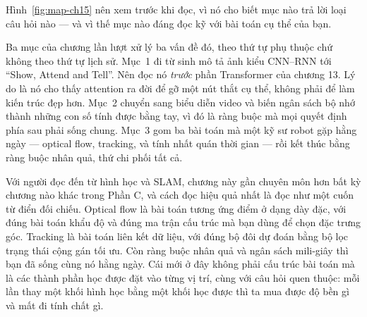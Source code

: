 \documentclass[../../deep_learning.tex]{subfiles}
\begin{document}
Hình~\ref{fig:map-ch15} nên xem trước khi đọc, vì nó cho biết mục nào trả lời loại câu hỏi nào --- và vì thế mục nào đáng đọc kỹ với bài toán cụ thể của bạn.

Ba mục của chương lần lượt xử lý ba vấn đề đó, theo thứ tự phụ thuộc chứ không theo thứ tự lịch sử. Mục~1 đi từ sinh mô tả ảnh kiểu CNN--RNN tới ``Show, Attend and Tell''. Nên đọc nó \emph{trước} phần Transformer của chương 13. Lý do là nó cho thấy attention ra đời để gỡ một nút thắt cụ thể, không phải để làm kiến trúc đẹp hơn. Mục~2 chuyển sang biểu diễn video và biến ngân sách bộ nhớ thành những con số tính được bằng tay, vì đó là ràng buộc mà mọi quyết định phía sau phải sống chung. Mục~3 gom ba bài toán mà một kỹ sư robot gặp hằng ngày --- optical flow, tracking, và tính nhất quán thời gian --- rồi kết thúc bằng ràng buộc nhân quả, thứ chi phối tất cả.

Với người đọc đến từ hình học và SLAM, chương này gần chuyên môn hơn bất kỳ chương nào khác trong Phần C, và cách đọc hiệu quả nhất là đọc như một cuốn từ điển đối chiếu. Optical flow là bài toán tương ứng điểm ở dạng dày đặc, với đúng bài toán khẩu độ và đúng ma trận cấu trúc mà bạn dùng để chọn đặc trưng góc. Tracking là bài toán liên kết dữ liệu, với đúng bộ đôi dự đoán bằng bộ lọc trạng thái cộng gán tối ưu. Còn ràng buộc nhân quả và ngân sách mili-giây thì bạn đã sống cùng nó hằng ngày. Cái mới ở đây không phải cấu trúc bài toán mà là các thành phần học được đặt vào từng vị trí, cùng với câu hỏi quen thuộc: mỗi lần thay một khối hình học bằng một khối học được thì ta mua được độ bền gì và mất đi tính chất gì.
\end{document}
